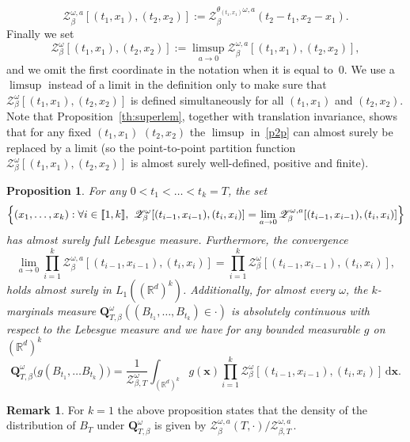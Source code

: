 \documentclass[JEP,XML,SOM,Unicode,published]{cedram}
\let\mathcal\mathscr
\let\sep:
\newcommand{\lint}{\mathopen{[\![}}
\newcommand{\rint}{\mathclose{]\!]}}
\newtheorem{proposition}[theorem]{Proposition}
\theoremstyle{definition}
\newtheorem{rem}[theorem]{Remark}
\newcommand{\bx}{\boldsymbol{x}}
\newcommand{\dd}{\mathrm{d}}
\newcommand{\cZ}{{\ensuremath{\mathcal Z}} }
\newcommand{\bQ}{{\ensuremath{\mathbf Q}} }
\newcommand{\bbR}{{\ensuremath{\mathbb R}} }
\let\gb\beta
\let\go\omega
\begin{document}
\begin{equation}
\cZ^{\go,a}_{\beta}[(t_1,x_1),(t_2,x_2)]:= \cZ^{\theta_{(t_1,x_1)}\go,a}_{\beta}(t_2-t_1, x_2-x_1).
\end{equation}
Finally we set
\begin{equation}
\label{p2p}
\cZ^{\go}_{\beta}[(t_1,x_1),(t_2,x_2)]:= \limsup_{a\to 0} \cZ^{\go,a}_{\beta}[(t_1,x_1),(t_2,x_2)],
\end{equation}
and we omit the first coordinate in the notation when it is equal to~$0$.
We use a $\limsup$ instead of a limit in the definition only to make sure that $\cZ^{\go}_{\beta}[(t_1,x_1),(t_2,x_2)]$ is defined simultaneously for all $(t_1,x_1)$ and $(t_2,x_2)$.
Note that Proposition~\ref{th:superlem}, togeth\-er with translation invariance, shows that
for any fixed $(t_1,x_1)$ $(t_2,x_2)$
the $\limsup$ in~\eqref{p2p} can almost surely be replaced by a limit (so the point-to-point partition function
$\cZ_{\gb}^{\go}[(t_1,x_1),(t_2,x_2)]$
is almost surely well-defined, positive and finite).

\begin{proposition}
\label{twomarg}
For any $0<t_1<\dots<t_k=T$,
the set
\[
\Bigl\{ (x_1, \ldots, x_k) \sep \forall i\in \lint 1,k\rint,\ \cZ^{\go}_{\beta}[(t_{i-1},x_{i-1}),(t_i,x_{i})] = \lim_{a\to 0} \cZ^{\go,a}_{\beta}[(t_{i-1},x_{i-1}),(t_i,x_{i})] \Bigr\}
\]
has almost surely full Lebesgue measure.
Furthermore, the convergence
\begin{equation}
\lim_{a\to 0}\prod_{i=1}^k \cZ^{\go,a}_{\beta}[(t_{i-1},x_{i-1}),(t_i,x_{i})]=\prod_{i=1}^k \cZ^{\go}_{\beta}[(t_{i-1},x_{i-1}),(t_i,x_{i})],
\end{equation}
holds almost surely in $L_1((\bbR^{d})^{k})$.
Additionally, for almost every $\go$, the $k$-marginals measure $\bQ^{\go}_{T,\beta}((B_{t_1},\dots, B_{t_k})\in \cdot)$ is absolutely continuous with respect to the Lebesgue measure
and we have for any bounded measurable $g$ on $(\bbR^{d})^{k}$
\begin{equation}
\bQ^{\go}_{T,\beta} \bigl(g(B_{t_1},\dots B_{t_k}) \bigr)= \frac{1 }{\mathcal Z^{\go}_{\beta,T}} \int_{(\bbR^d)^k} g(\bx)\prod_{i=1}^k \cZ^{\go}_{\beta}[(t_{i-1},x_{i-1}),(t_i,x_{i})] \,\dd \bx.
\end{equation}
\end{proposition}

\begin{rem}
For $k=1$ the above proposition states that the density of the distribution of $B_T$ under $\bQ_{T,\gb}^{\go}$ is given by $\cZ^{\go,a}_{\beta}(T,\cdot)/\cZ^{\go,a}_{\beta,T}\,$.
\end{rem}
\end{document}
